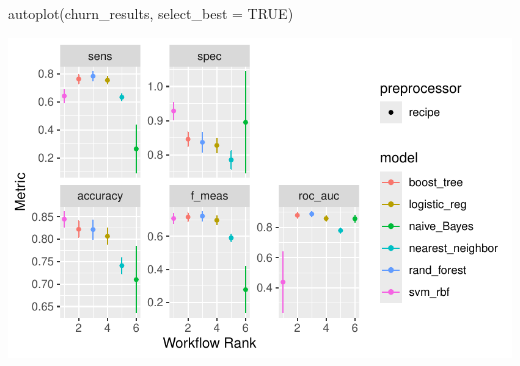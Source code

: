 \documentclass[
  11pt,
  letterpaper,
  DIV=11,
  numbers=noendperiod]{scrartcl}
\newenvironment{Shaded}{\begin{snugshade}}{\end{snugshade}}
\newcommand{\AttributeTok}[1]{\textcolor[rgb]{0.40,0.45,0.13}{#1}}
\newcommand{\ConstantTok}[1]{\textcolor[rgb]{0.56,0.35,0.01}{#1}}
\newcommand{\FunctionTok}[1]{\textcolor[rgb]{0.28,0.35,0.67}{#1}}
\newcommand{\NormalTok}[1]{\textcolor[rgb]{0.00,0.23,0.31}{#1}}
\begin{document}
\begin{Shaded}
\begin{Highlighting}[]
\FunctionTok{autoplot}\NormalTok{(churn\_results, }\AttributeTok{select\_best =} \ConstantTok{TRUE}\NormalTok{)}
\end{Highlighting}
\end{Shaded}

\includegraphics{Quarto_files/figure-pdf/unnamed-chunk-11-1.pdf}
\end{document}
